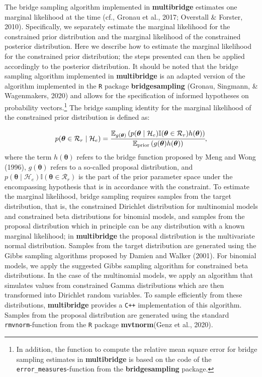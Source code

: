 \documentclass[
  english,
  man,floatsintext]{apa6}
\begin{document}
The bridge sampling algorithm implemented in \textbf{multibridge} estimates one marginal likelihood at the time (cf., Gronau et al., 2017; Overstall \& Forster, 2010). Specifically, we separately estimate the marginal likelihood for the constrained prior distribution and the marginal likelihood of the constrained posterior distribution. Here we describe how to estimate the marginal likelihood for the constrained prior distribution; the steps presented can then be applied accordingly to the posterior distribution. It should be noted that the bridge sampling algorithm implemented in \textbf{multibridge} is an adapted version of the algorithm implemented in the \texttt{R} package \textbf{bridgesampling} (Gronau, Singmann, \& Wagenmakers, 2020) and allows for the specification of informed hypotheses on probability vectors.\footnote{In addition, the function to compute the relative mean square error for bridge sampling estimates in \textbf{multibridge} is based on the code of the \texttt{error\_measures}-function from the \textbf{bridgesampling} package.} The bridge sampling identity for the marginal likelihood of the constrained prior distribution is defined as:

\begin{align}
    p(\boldsymbol{\theta} \in \mathcal{R}_r \mid \mathcal{H}_e) = \cfrac{\mathbb{E}_{g(\boldsymbol{\theta})}\left(p(\boldsymbol{\theta}\mid \mathcal{H}_e) \mathbb{I}(\boldsymbol{\theta}\in\mathcal{R}_r)h(\boldsymbol{\theta})\right)}{\mathbb{E}_{\text{prior}} \left(g(\boldsymbol{\theta})h(\boldsymbol{\theta})\right)},
    \label{Eq:bridgeidentity}
\end{align}
where the term \(h(\boldsymbol{\theta})\) refers to the bridge function proposed by Meng and Wong (1996), \(g(\boldsymbol{\theta})\) refers to a so-called proposal distribution, and \(p(\boldsymbol{\theta}\mid \mathcal{H}_e) \mathbb{I}(\boldsymbol{\theta}\in\mathcal{R}_r)\) is the part of the prior parameter space under the encompassing hypothesis that is in accordance with the constraint. To estimate the marginal likelihood, bridge sampling requires samples from the target distribution, that is, the constrained Dirichlet distribution for multinomial models and constrained beta distributions for binomial models, and samples from the proposal distribution which in principle can be any distribution with a known marginal likelihood; in \textbf{multibridge} the proposal distribution is the multivariate normal distribution. Samples from the target distribution are generated using the Gibbs sampling algorithms proposed by Damien and Walker (2001). For binomial models, we apply the suggested Gibbs sampling algorithm for constrained beta distributions. In the case of the multinomial models, we apply an algorithm that simulates values from constrained Gamma distributions which are then transformed into Dirichlet random variables. To sample efficiently from these distributions, \textbf{multibridge} provides a \texttt{C++} implementation of this algorithm. Samples from the proposal distribution are generated using the standard \texttt{rmvnorm}-function from the \texttt{R} package \textbf{mvtnorm}(Genz et al., 2020).
\end{document}
